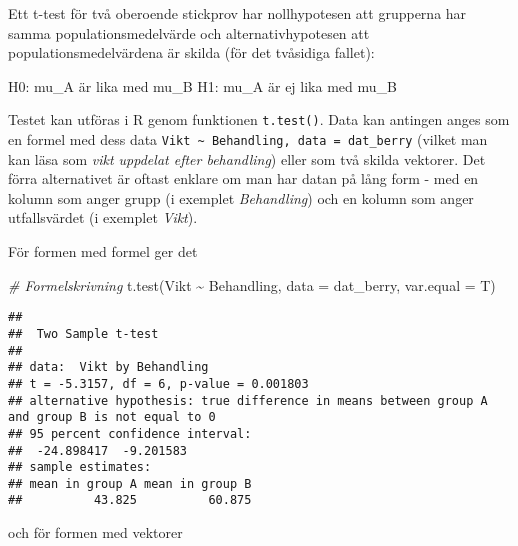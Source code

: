 \documentclass[
]{book}
\newenvironment{Shaded}{\begin{snugshade}}{\end{snugshade}}
\newcommand{\AttributeTok}[1]{\textcolor[rgb]{0.77,0.63,0.00}{#1}}
\newcommand{\CommentTok}[1]{\textcolor[rgb]{0.56,0.35,0.01}{\textit{#1}}}
\newcommand{\DocumentationTok}[1]{\textcolor[rgb]{0.56,0.35,0.01}{\textbf{\textit{#1}}}}
\newcommand{\FunctionTok}[1]{\textcolor[rgb]{0.00,0.00,0.00}{#1}}
\newcommand{\NormalTok}[1]{#1}
\newcommand{\OtherTok}[1]{\textcolor[rgb]{0.56,0.35,0.01}{#1}}
\newcommand{\SpecialCharTok}[1]{\textcolor[rgb]{0.00,0.00,0.00}{#1}}
\newcommand{\StringTok}[1]{\textcolor[rgb]{0.31,0.60,0.02}{#1}}
\theoremstyle{definition}
\theoremstyle{definition}
\theoremstyle{definition}
\theoremstyle{definition}
\theoremstyle{remark}
\begin{document}
Ett t-test för två oberoende stickprov har nollhypotesen att grupperna har samma populationsmedelvärde och alternativhypotesen att populationsmedelvärdena är skilda (för det tvåsidiga fallet):

H0: mu\_A är lika med mu\_B
H1: mu\_A är ej lika med mu\_B

Testet kan utföras i R genom funktionen \texttt{t.test()}. Data kan antingen anges som en formel med dess data \texttt{Vikt\ \textasciitilde{}\ Behandling,\ data\ =\ dat\_berry} (vilket man kan läsa som \emph{vikt uppdelat efter behandling}) eller som två skilda vektorer. Det förra alternativet är oftast enklare om man har datan på lång form - med en kolumn som anger grupp (i exemplet \emph{Behandling}) och en kolumn som anger utfallsvärdet (i exemplet \emph{Vikt}).

För formen med formel ger det

\begin{Shaded}
\begin{Highlighting}[]
\CommentTok{\# Formelskrivning}
\FunctionTok{t.test}\NormalTok{(Vikt }\SpecialCharTok{\textasciitilde{}}\NormalTok{ Behandling, }\AttributeTok{data =}\NormalTok{ dat\_berry, }\AttributeTok{var.equal =}\NormalTok{ T)}
\end{Highlighting}
\end{Shaded}

\begin{verbatim}
## 
##  Two Sample t-test
## 
## data:  Vikt by Behandling
## t = -5.3157, df = 6, p-value = 0.001803
## alternative hypothesis: true difference in means between group A and group B is not equal to 0
## 95 percent confidence interval:
##  -24.898417  -9.201583
## sample estimates:
## mean in group A mean in group B 
##          43.825          60.875
\end{verbatim}

och för formen med vektorer

\begin{Shaded}
\end{Shaded}
\end{document}
